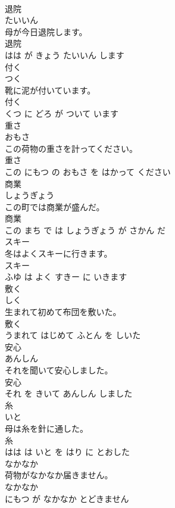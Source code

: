 \documentclass[8pt]{extreport}
\begin{document}
\begin{CJK}{UTF8}{min}
\\	退院	
\\	たいいん			
\\	母が今日退院します。	
\\	退院 
\\	はは が きょう たいいん します			
\\	付く	
\\	つく			
\\	靴に泥が付いています。	
\\	付く 
\\	くつ に どろ が ついて います			
\\	重さ	
\\	おもさ			
\\	この荷物の重さを計ってください。	
\\	重さ 
\\	この にもつ の おもさ を はかって ください			
\\	商業	
\\	しょうぎょう			
\\	この町では商業が盛んだ。	
\\	商業 
\\	この まち で は しょうぎょう が さかん だ			
\\	スキー	
\\	冬はよくスキーに行きます。	
\\	スキー 
\\	ふゆ は よく すきー に いきます			
\\	敷く	
\\	しく			
\\	生まれて初めて布団を敷いた。	
\\	敷く 
\\	うまれて はじめて ふとん を しいた			
\\	安心	
\\	あんしん			
\\	それを聞いて安心しました。	
\\	安心 
\\	それ を きいて あんしん しました			
\\	糸	
\\	いと			
\\	母は糸を針に通した。	
\\	糸 
\\	はは は いと を はり に とおした			
\\	なかなか	
\\	荷物がなかなか届きません。	
\\	なかなか 
\\	にもつ が なかなか とどきません			

\end{CJK}
\end{document}
